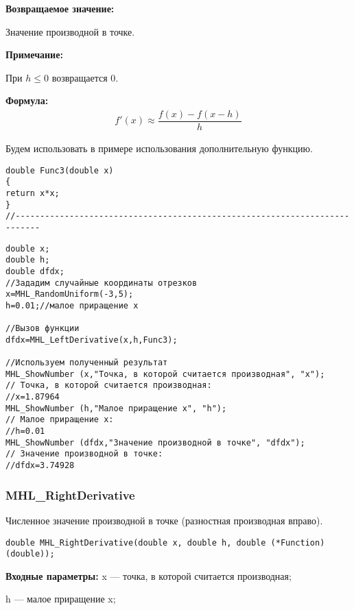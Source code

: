 \documentclass[a4paper,12pt]{article}
\begin{document}
\textbf{Возвращаемое значение:}
 
 Значение производной в точке.
 
 \textbf{Примечание:}
 
 При $h\leq0$ возвращается $0$.

\textbf{Формула:}
\begin{eqnarray*}
f'\left( x\right) \approx \dfrac{f\left( x\right)-f\left( x-h\right) }{h}
\end{eqnarray*}

Будем использовать в примере использования дополнительную функцию.

\begin{lstlisting}[caption=Дополнительная функция]
double Func3(double x)
{
return x*x;
}
//---------------------------------------------------------------------------
\end{lstlisting}


\begin{lstlisting}[label=code_use_MHL_LeftDerivative,caption=Пример использования]
double x;
double h;
double dfdx;
//Зададим случайные координаты отрезков
x=MHL_RandomUniform(-3,5);
h=0.01;//малое приращение x

//Вызов функции
dfdx=MHL_LeftDerivative(x,h,Func3);

//Используем полученный результат
MHL_ShowNumber (x,"Точка, в которой считается производная", "x");
// Точка, в которой считается производная:
//x=1.87964
MHL_ShowNumber (h,"Малое приращение x", "h");
// Малое приращение x:
//h=0.01
MHL_ShowNumber (dfdx,"Значение производной в точке", "dfdx");
// Значение производной в точке:
//dfdx=3.74928
\end{lstlisting}

\subsubsection{MHL\_RightDerivative}\label{MHL_RightDerivative}

Численное значение производной в точке (разностная производная вправо).


\begin{lstlisting}[label=code_syntax_MHL_RightDerivative,caption=Синтаксис]
double MHL_RightDerivative(double x, double h, double (*Function)(double));
\end{lstlisting}

\textbf{Входные параметры:}
 x --- точка, в которой считается производная;
 
 h --- малое приращение x;
 
\end{document}
